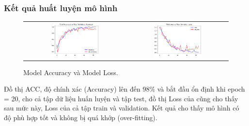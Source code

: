\subsubsection{Kết quả huất luyện mô hình}

\begin{figure}[h!] 
	\begin{tabular}{cc}
		\centering
		\includegraphics[width=0.5\textwidth]{Figures/acc_model1.png} &
		\includegraphics[width=0.5\textwidth]{Figures/loss_model1.png} 
	\end{tabular}
	\caption[Model Accuracy và Model Loss.]{Model Accuracy và Model Loss.}
	\label{fig:modelloss_and_Model Accuracy}
\end{figure}

Đồ thị ACC,  độ chính xác (Accuracy) lên đến 98\% và bắt đầu ổn định khi epoch = 20,  cho cả tập dữ liệu huấn luyện và tập test, đồ thị Loss của cũng cho thấy sau mức này, Loss của cả tập train và validation. Kết quả cho thấy mô hình có độ phù hợp tốt và không bị quá khớp (over-fitting).

